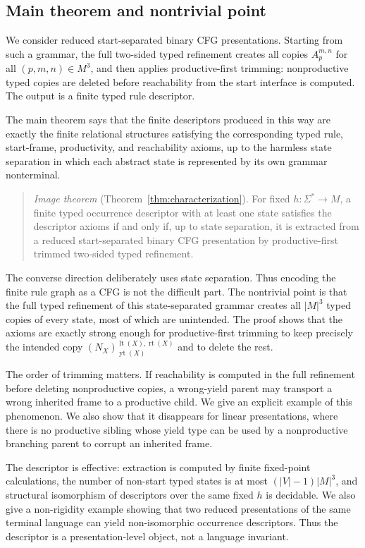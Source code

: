 \documentclass[sub]{jalc}
\newcommand{\yt}{\operatorname{yt}}
\newcommand{\lt}{\operatorname{lt}}
\newcommand{\rt}{\operatorname{rt}}
\begin{document}
\subsection{Main theorem and nontrivial point}
\label{subsec:main-results}

We consider reduced start-separated binary CFG presentations.  Starting from
such a grammar, the full two-sided typed refinement creates all copies
\(A_p^{m,n}\) for all \((p,m,n)\in M^3\), and then applies productive-first
trimming: nonproductive typed copies are deleted before reachability from the
start interface is computed.  The output is a finite typed rule descriptor.

The main theorem says that the finite descriptors produced in this way are
exactly the finite relational structures satisfying the corresponding typed
rule, start-frame, productivity, and reachability axioms, up to the harmless
state separation in which each abstract state is represented by its own grammar
nonterminal.

\begin{quote}
\emph{Image theorem} (Theorem~\ref{thm:characterization}).  For fixed
\(h:\Sigma^*\to M\), a finite typed occurrence descriptor with at least one
state satisfies the descriptor axioms if and only if, up to state separation, it
is extracted from a reduced start-separated binary CFG presentation by
productive-first trimmed two-sided typed refinement.
\end{quote}

The converse direction deliberately uses state separation.  Thus encoding the
finite rule graph as a CFG is not the difficult part.  The nontrivial point is
that the full typed refinement of this state-separated grammar creates all
\(|M|^3\) typed copies of every state, most of which are unintended.  The proof
shows that the axioms are exactly strong enough for productive-first trimming
to keep precisely the intended copy
\((N_X)_{\yt(X)}^{\lt(X),\rt(X)}\) and to delete the rest.

The order of trimming matters.  If reachability is computed in the full
refinement before deleting nonproductive copies, a wrong-yield parent may
transport a wrong inherited frame to a productive child.  We give an explicit
example of this phenomenon.  We also show that it disappears for linear
presentations, where there is no productive sibling whose yield type can be
used by a nonproductive branching parent to corrupt an inherited frame.

The descriptor is effective: extraction is computed by finite fixed-point
calculations, the number of non-start typed states is at most
\((|V|-1)|M|^3\), and structural isomorphism of descriptors over the same fixed
\(h\) is decidable.  We also give a non-rigidity example showing that two
reduced presentations of the same terminal language can yield non-isomorphic
occurrence descriptors.  Thus the descriptor is a presentation-level object,
not a language invariant.
\end{document}
